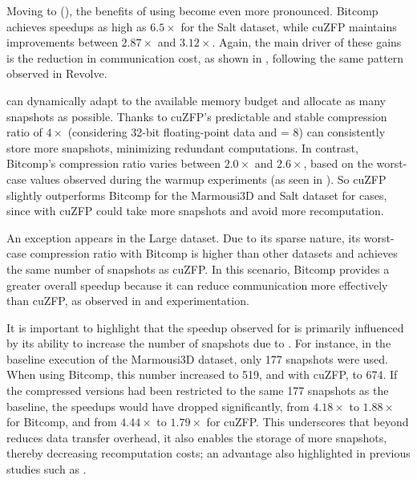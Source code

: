 \documentclass[Ingles]{ic-tese-v3}
\begin{document}
Moving to \zcut (), the benefits of using \compression become even more pronounced. Bitcomp achieves speedups as high as $6.5\times$ for the Salt dataset, while cuZFP maintains improvements between $2.87\times$ and $3.12\times$. Again, the main driver of these gains is the reduction in communication cost, as shown in , following the same pattern observed in Revolve. 



 \uniform can dynamically adapt to the available memory budget and allocate as many snapshots as possible. Thanks to cuZFP's predictable and stable compression ratio of $4\times$ (considering 32-bit floating-point data and  = 8) \uniform can consistently store more snapshots, minimizing redundant computations. In contrast, Bitcomp's compression ratio varies between $2.0\times$ and $2.6\times$, based on the worst-case values observed during the warmup experiments (as seen in ). So cuZFP slightly outperforms Bitcomp for the Marmousi3D and Salt dataset for \uniform cases, since with cuZFP \uniform could take more snapshots and avoid more recomputation.

An exception appears in the Large dataset. Due to its sparse nature, its worst-case compression ratio with Bitcomp is higher than other datasets and achieves the same number of snapshots as cuZFP. In this scenario, Bitcomp provides a greater overall speedup because it can reduce communication more effectively than cuZFP, as observed in \revolve and \zcut experimentation.

It is important to highlight that the speedup observed for \uniform is primarily influenced by its ability to increase the number of snapshots due to \compression. For instance, in the baseline execution of the Marmousi3D dataset, only 177 snapshots were used. When using Bitcomp, this number increased to 519, and with cuZFP, to 674. If the compressed versions had been restricted to the same 177 snapshots as the baseline, the speedups would have dropped significantly, from $4.18\times$ to $1.88\times$ for Bitcomp, and from $4.44\times$ to $1.79\times$ for cuZFP. This underscores that beyond \compression reduces data transfer overhead, it also enables the storage of more snapshots, thereby decreasing recomputation costs; an advantage also highlighted in previous studies such as \cite{kukreja2020}.
\end{document}
